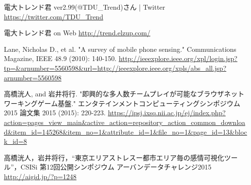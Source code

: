 \begin{thebibliography}{99}
        電大トレンド君 ver2.99(@TDU\_Trend)さん | Twitter
        \url{https://twitter.com/TDU_Trend}

        電大トレンド君 on Web
        \url{http://trend.elzup.com/}

        Lane, Nicholas D., et al. "A survey of mobile phone sensing." Communications Magazine, IEEE 48.9 (2010): 140-150.
        \url{http://ieeexplore.ieee.org/xpl/login.jsp?tp=&arnumber=5560598&url=http://ieeexplore.ieee.org/xpls/abs_all.jsp?arnumber=5560598}

        高橋洸人, and 岩井将行. "即興的な多人数チームプレイが可能なブラウザネットワーキングゲーム基盤." エンタテインメントコンピューティングシンポジウム 2015 論文集 2015 (2015): 220-223.
        \url{https://ipsj.ixsq.nii.ac.jp/ej/index.php?action=pages_view_main&active_action=repository_action_common_download&item_id=145268&item_no=1&attribute_id=1&file_no=1&page_id=13&block_id=8}

        高橋洸人，岩井将行，“東京エリアストレスー都市エリア毎の感情可視化ツール”，CSISi 第12回公開シンポジウム アーバンデータチャレンジ2015
        \url{http://aigid.jp/?p=1248}

\end{thebibliography}
